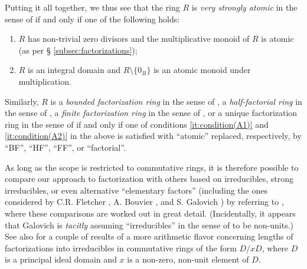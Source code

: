 Putting it all together, we thus see that the ring $R$ is \emph{very strongly atomic} in the sense of \cite[Definition 3.1]{AnVL96} if and only if one of the following holds:
\begin{enumerate}[label={(\small{A}\arabic{*})}]
	\item\label{it:condition(A1)} $R$ has non-trivial zero divisors and the multiplicative monoid of $R$ is atomic (as per \S{ }\ref{subsec:factorizations});
	\item\label{it:condition(A2)} $R$ is an integral domain and $R \setminus \{0_R\}$ is an atomic monoid under multiplication.
\end{enumerate}
Similarly, $R$ is a \emph{bounded factorization ring} in the sense of \cite[Definition 3.8]{AnVL96}, a \emph{half-factorial ring} in the sense of \cite[p. 87]{AxFoRoSt03}, a \emph{finite factorization ring} in the sense of \cite[Definition 6.5]{AnVL96}, or a unique factorization ring in the sense of \cite[Definition 4.3]{AnVL96} if and only if one of conditions \ref{it:condition(A1)} and \ref{it:condition(A2)} in the above is satisfied with ``atomic'' replaced, respectively, by ``BF'', ``HF'', ``FF'', or ``factorial''.

As long as the scope is restricted to commutative rings, it is therefore possible to compare our approach to factorization with others based on irreducibles, strong irreducibles, or even alternative ``elementary factors'' (including the ones considered by C.R. Fletcher \cite{Fl69}, A. Bouvier \cite{Bou74a, Bou74b}, and S. Galovich \cite{Ga78}) by referring to \cite{AnVL96,ChunAnd11}, where these comparisons are worked out in great detail. (Incidentally, it appears that Galovich is \emph{tacitly} assuming ``irreducibles'' in the sense of \cite{Ga78} to be non-units.) See also \cite[Theorem 3.4 and Corollary 3.5]{BaBuMi17} for a couple of results of a more arithmetic flavor concerning lengths of factorizations into irreducibles in commutative rings of the form $D/xD$, where $D$ is a principal ideal domain and $x$ is a non-zero, non-unit element of $D$. 
